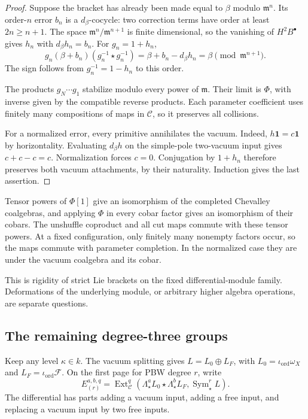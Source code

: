 \begin{proof}
Suppose the bracket
has already been
made equal to
$\beta$ modulo
$\mathfrak m^n$.
Its order-$n$ error
$b_n$ is a
$d_\beta$-cocycle:
two correction terms
have order at
least $2n\geq n+1$.
The space
$\mathfrak m^n/\mathfrak m^{n+1}$
is finite dimensional,
so the vanishing
of $H^2B^\bullet$
gives $h_n$ with
$d_\beta h_n=b_n$.
For $g_n=1+h_n$,
\begin{equation}\label{v4-arith:centers:eq:gauge-step}
 g_n(\beta+b_n)(g_n^{-1}\star g_n^{-1})
 =\beta+b_n-d_\beta h_n
 =\beta\pmod{\mathfrak m^{n+1}}.
\end{equation}
The sign follows
from $g_n^{-1}=1-h_n$
to this order.

The products
$g_N\cdots g_1$
stabilize modulo
every power of
$\mathfrak m$.
Their limit is
$\Phi$, with
inverse given by
the compatible
reverse products.
Each parameter
coefficient uses
finitely many
compositions of
maps in $\mathcal C$,
so it preserves
all collisions.

For a normalized
error, every
primitive annihilates
the vacuum.
Indeed,
$h\mathbf1=c\mathbf1$
by horizontality.
Evaluating $d_\beta h$
on the simple-pole
two-vacuum input
gives $c+c-c=c$.
Normalization forces
$c=0$.
Conjugation by
$1+h_n$ therefore
preserves both
vacuum attachments,
by their naturality.
Induction gives
the last assertion.
\end{proof}

Tensor powers of
$\Phi[1]$ give an
isomorphism of
the completed
Chevalley coalgebras,
and applying $\Phi$
in every cobar
factor gives an
isomorphism of
their cobars.
The unshuffle
coproduct and all
cut maps commute
with these tensor
powers.
At a fixed
configuration, only
finitely many
nonempty factors
occur, so the
maps commute with
parameter completion.
In the normalized
case they are
under the vacuum
coalgebra and its
cobar.

This is rigidity
of strict Lie
brackets on the
fixed differential-module
family. Deformations
of the underlying
module, or arbitrary
higher algebra
operations, are
separate questions.

\subsection{The remaining degree-three groups}
\label{v4-arith:centers:subsec:degree-three}

Keep any level
$\kappa\in k$.
The vacuum splitting
gives
$L=L_0\oplus L_F$,
with
$L_0=\iota_{\mathrm{ord}}\omega_X$
and
$L_F=\iota_{\mathrm{ord}}\mathscr F$.
On the first page
for PBW degree $r$,
write
\[
 E^{a,b,q}_{(r)}
 =
 \operatorname{Ext}^q_{\mathcal C}
 \left(\Lambda^a_\star L_0\star
       \Lambda^b_\star L_F,\operatorname{Sym}^r_\star L\right).
\]
The differential has
parts adding a
vacuum input,
adding a free
input, and replacing
a vacuum input by
two free inputs.

